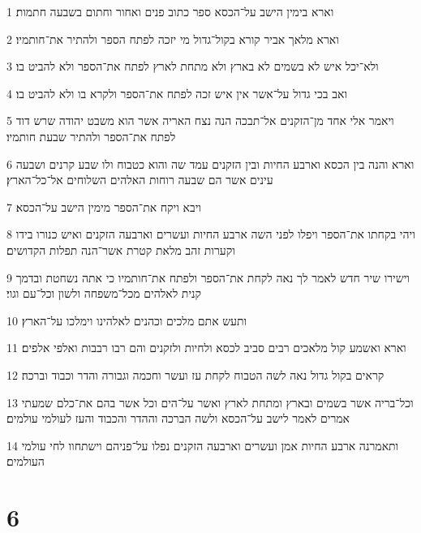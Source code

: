\par 1 וארא בימין הישב על־הכסא ספר כתוב פנים ואחור וחתום בשבעה חתמות׃
\par 2 וארא מלאך אביר קורא בקול־גדול מי יזכה לפתח הספר ולהתיר את־חותמיו׃
\par 3 ולא־יכל איש לא בשמים לא בארץ ולא מתחת לארץ לפתח את־הספר ולא להביט בו׃
\par 4 ואב בכי גדול על־אשר אין איש זכה לפתח את־הספר ולקרא בו ולא להביט בו׃
\par 5 ויאמר אלי אחד מן־הזקנים אל־תבכה הנה נצח האריה אשר הוא משבט יהודה שרש דוד לפתח את־הספר ולהתיר שבעת חותמיו׃
\par 6 וארא והנה בין הכסא וארבע החיות ובין הזקנים עמד שה והוא כטבוח ולו שבע קרנים ושבעה עינים אשר הם שבעה רוחות האלהים השלוחים אל־כל־הארץ׃
\par 7 ויבא ויקח את־הספר מימין הישב על־הכסא׃
\par 8 ויהי בקחתו את־הספר ויפלו לפני השה ארבע החיות ועשרים וארבעה הזקנים ואיש כנורו בידו וקערות זהב מלאת קטרת אשר־הנה תפלות הקדושים׃
\par 9 וישירו שיר חדש לאמר לך נאה לקחת את־הספר ולפתח את־חותמיו כי אתה נשחטת ובדמך קנית לאלהים מכל־משפחה ולשון וכל־עם וגוי׃
\par 10 ותעש אתם מלכים וכהנים לאלהינו וימלכו על־הארץ׃
\par 11 וארא ואשמע קול מלאכים רבים סביב לכסא ולחיות ולזקנים והם רבו רבבות ואלפי אלפים׃
\par 12 קראים בקול גדול נאה לשה הטבוח לקחת עז ועשר וחכמה וגבורה והדר וכבוד וברכה׃
\par 13 וכל־בריה אשר בשמים ובארץ ומתחת לארץ ואשר על־הים וכל אשר בהם את־כלם שמעתי אמרים לאמר לישב על־הכסא ולשה הברכה וההדר והכבוד והעז לעולמי עולמים׃
\par 14 ותאמרנה ארבע החיות אמן ועשרים וארבעה הזקנים נפלו על־פניהם וישתחוו לחי עולמי העולמים׃

\chapter{6}

